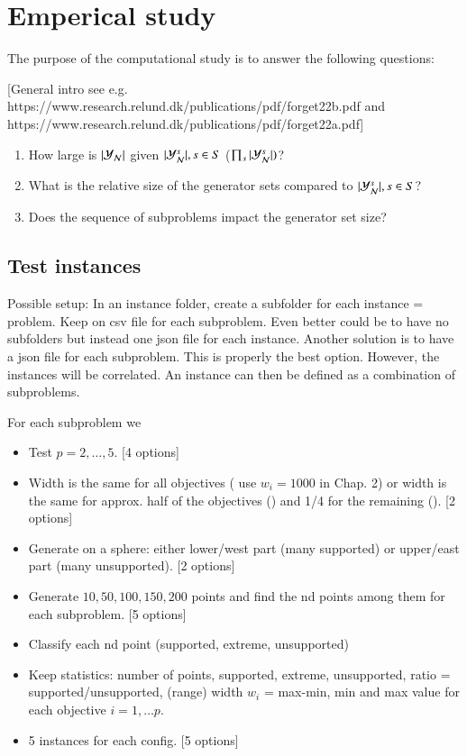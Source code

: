 \section{Emperical study}

The purpose of the computational study is to answer the following questions:

[General intro see e.g. https://www.research.relund.dk/publications/pdf/forget22b.pdf and https://www.research.relund.dk/publications/pdf/forget22a.pdf]

\begin{enumerate}
    \item How large is $|\mathcal{Y}_{\mathcal{N}}|$ given $|\mathcal{Y}_{\mathcal{N}}^s|, s\in S$ ($\prod_s |\mathcal{Y}_{\mathcal{N}}^s|)$?
    \item What is the relative size of the generator sets compared to $|\mathcal{Y}_{\mathcal{N}}^s|, s\in S$?
    \item Does the sequence of subproblems impact the generator set size? 
\end{enumerate}

\subsection{Test instances}

Possible setup: In an instance folder, create a subfolder for each instance = problem. Keep on csv file for each subproblem. Even better could be to have no subfolders but instead one json file for each instance. Another solution is to have a json file for each subproblem. This is properly the best option. However, the instances will be correlated. An instance can then be defined as a combination of subproblems.

For each subproblem we

\begin{itemize}
    \item Test $p=2,\ldots, 5$. [4 options]
    \item Width is the same for all objectives (\cite{Kerberenes2022phd} use $w_i=1000$ in Chap. 2) or width is the same for approx. half of the objectives () and 1/4 for the remaining (). [2 options]
    \item Generate on a sphere: either lower/west part (many supported) or upper/east part (many unsupported). [2 options]
    \item Generate $10, 50, 100, 150, 200$ points and find the nd points among them for each subproblem. [5 options]
    \item Classify each nd point (supported, extreme, unsupported)
    \item Keep statistics: number of points, supported, extreme, unsupported, ratio = supported/unsupported, (range) width $w_i$ = max-min, min and max value for each objective $i = 1,\ldots p$.
    \item 5 instances for each config. [5 options]
\end{itemize}

